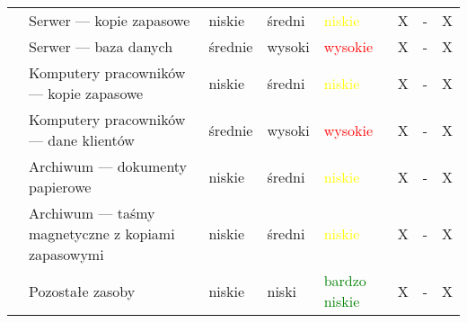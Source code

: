\begin{landscape}
\begin{longtable}[ht!]{|m{4cm}|m{6cm}|m{4.5cm}|m{2.5cm}|m{2.5cm}|m{0.5cm}|m{0.5cm}|m{0.5cm}|}
		& Serwer --- kopie zapasowe & niskie & średni & \textcolor{yellow}{niskie} & X & - & X  \\ \cline{2-8} 
		& Serwer --- baza danych & średnie & wysoki & \textcolor{red}{wysokie} & X & - & X  \\ \cline{2-8} 
		& Komputery pracowników --- kopie zapasowe & niskie & średni & \textcolor{yellow}{niskie}  & X & - & X  \\ \cline{2-8} 
		& Komputery pracowników --- dane klientów & średnie & wysoki & \textcolor{red}{wysokie}  & X & - & X  \\ \cline{2-8} 
		& Archiwum --- dokumenty papierowe & niskie & średni & \textcolor{yellow}{niskie}  & X & - & X  \\ \cline{2-8} 
		& Archiwum --- taśmy magnetyczne z kopiami zapasowymi & niskie & średni & \textcolor{yellow}{niskie}  & X & - & X  \\ \cline{2-8} 
		& Pozostałe zasoby &  niskie & niski & \textcolor{green}{bardzo niskie}  & X & - & X  \\ \cline{2-8} 
		\hline
	\end{longtable}
\end{landscape}